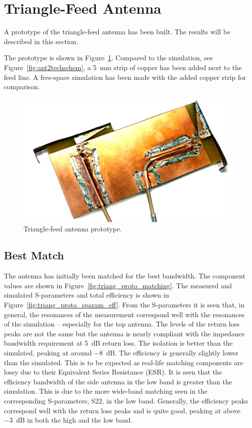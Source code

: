 \section{Triangle-Feed Antenna}

A prototype of the triangle-feed antenna has been built. The results will be described in this section.

The prototype is shown in Figure~\ref{fig:triang_proto}. Compared to the simulation, see Figure~\ref{fig:ant2techschem}, a \SI{5}{mm} strip of copper has been added next to the feed line. A free-space simulation has been made with the added copper strip for comparison. 

\begin{figure}[htbp]
    \centering
    \includegraphics{img/tech_sol/trianglefeed/mockup/mockup.jpg}
    \caption{Triangle-feed antenna prototype.}
    \label{fig:triang_proto}
\end{figure}

\subsection{Best Match}

The antenna has initially been matched for the best bandwidth. The component values are shown in Figure~\ref{fig:triang_proto_matching}. The measured and simulated S-parameters and total efficiency is shown in Figure~\ref{fig:triang_proto_sparam_eff}. From the S-parameters it is seen that, in general, the resonances of the measurement correspond well with the resonances of the simulation -- especially for the top antenna. The levels of the return loss peaks are not the same but the antenna is nearly compliant with the impedance bandwidth requirement at \SI{5}{dB} return loss. The isolation is better than the simulated, peaking at around \SI{-8}{dB}. The efficiency is generally slightly lower than the simulated. This is to be expected as real-life matching components are lossy due to their Equivalent Series Resistance (ESR). It is seen that the efficiency bandwidth of the side antenna in the low band is greater than the simulation. This is due to the more wide-band matching seen in the corresponding S-parameters, S22, in the low band. Generally, the efficiency peaks correspond well with the return loss peaks and is quite good, peaking at above \SI{-3}{dB} in both the high and the low band.

